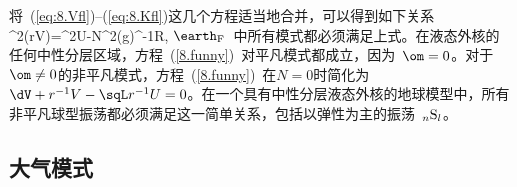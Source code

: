 {将~(\ref{eq:8.Vfl})--(\ref{eq:8.Kfl})这几个方程适当地合并，可以得到如下关系
\eq
\label{8.funny}
\om^2(rV)=\om^2\sqL U-\sqL N^2(\rho g)^{-1}R,
\en
$\earth_{\rm F}$~中所有模式都必须满足上式。在液态外核的任何中性分层区域，方程~(\ref{8.funny})~对平凡模式都成立，因为~$\om=0$。对于~$\om\not=0$的非平凡模式，方程~(\ref{8.funny})~在$N=0$时简化为~$\dV+r^{-1}V-\sqL r^{-1}U=0$。在一个具有中性分层液态外核的地球模型中，所有非平凡球型振荡都必须满足这一简单关系，包括以弹性为主的振荡~${}_n{\rm S}_l$。
%
%
%
%
%
%
%

\renewcommand{\thesubsection}{$\!\!\!\raise1.3ex\hbox{$\star$}\!\!$
\arabic{chapter}.\arabic{section}.\arabic{subsection}}
\subsection{大气模式}
%
%
\renewcommand{\thesubsection}{\arabic{chapter}.\arabic{section}.\arabic{subsection}}

}
